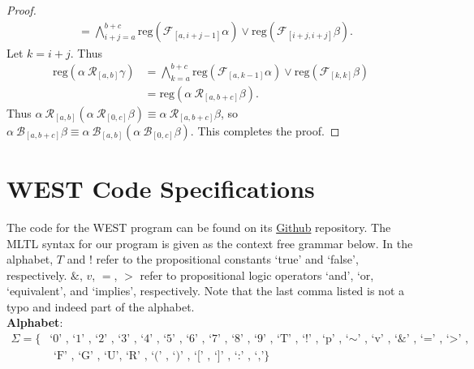 \documentclass[runningheads]{llncs}
\begin{document}
\begin{proof}
\begin{align*}
&= \bigwedge_{i+j=a}^{b+c} \text{reg}\left(\mathcal{F}_{[a,i+j-1]}\alpha\right) \lor \text{reg}\left(\mathcal{F}_{[i+j, i+j]}\beta  \right).
\end{align*}
Let $k = i + j$. Thus
\begin{align*}
\text{reg}\left(\alpha \ \mathcal{R}_{[a,b]}\gamma\right) &= \bigwedge_{k=a}^{b+c} \text{reg}\left(\mathcal{F}_{[a,k-1]}\alpha\right) \lor \text{reg}\left(\mathcal{F}_{[k, k]}\beta  \right) \\
&= \text{reg}\left(\alpha \ \mathcal{R}_{[a,b+c]} \beta\right).
\end{align*}
Thus  $\alpha \ \mathcal{R}_{[a,b]}(\alpha \ \mathcal{R}_{[0,c]} \beta) \equiv \alpha \ \mathcal{R}_{[a,b+c]} \beta$, so $\alpha \ \mathcal{B}_{[a,b+c]} \beta \equiv \alpha \ \mathcal{B}_{[a,b]}(\alpha \ \mathcal{B}_{[0,c]} \beta)$. This completes the proof.
\end{proof}


\section{WEST Code Specifications} \label{specs}
 The code for the WEST program can be found on its \href{https://github.com/zwang271/2022-Iowa-State-REU-Temporal-Logic-.git}{Github} repository. The MLTL syntax for our program is given as the context free grammar below. In the alphabet, $T$ and $!$ refer to the propositional constants `true' and `false', respectively. $\&$, $v$, $=$, $>$ refer to propositional logic operators `and', `or, `equivalent', and `implies', respectively. Note that the last comma listed is not a typo and indeed part of the alphabet. \\
\textbf{Alphabet}: 
\begin{align*}
    \Sigma = \{&\text{`0' , `1' , `2' , `3' , `4' , `5' , `6' , `7' , `8' , `9' , `T' , `!' , `p' , `$\scriptstyle{\sim}$' , `v' , `\&' , `=' , `>' ,}\\
    &\text{ `F' , `G' , `U', `R' , `(' , `)' , `[' , `]' , `:' , `,'}\}
\end{align*}
\end{document}
